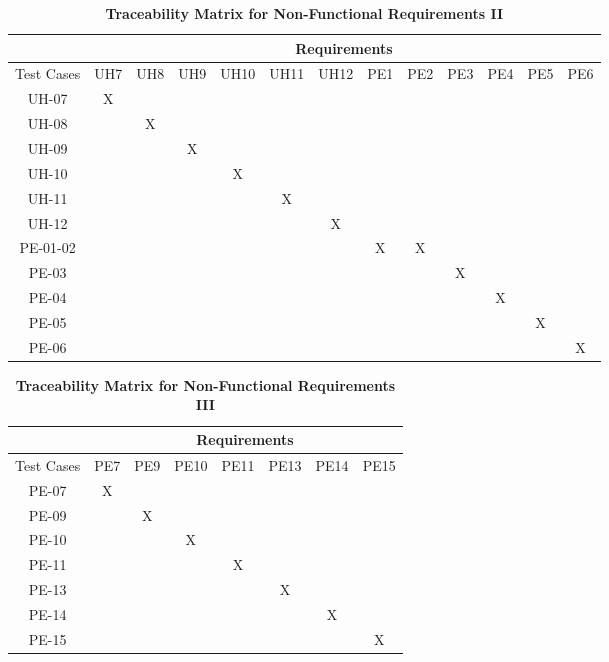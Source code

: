\documentclass[12pt, titlepage]{article}
\begin{document}
\begin{landscape}
\newpage

\begin{table}[h!]
\centering
\caption{\textbf{Traceability Matrix for Non-Functional Requirements II}}
\label{tab:trace_matrix_03}
\begin{tabular}{|c|c|c|c|c|c|c|c|c|c|c|c|c|}
\hline
& \multicolumn{12}{c|}{Requirements} \\
\hline
Test Cases & UH7 & UH8 & UH9 & UH10 & UH11 & UH12 & PE1 & PE2 & PE3 & PE4 & PE5 & PE6 \\
\hline
UH-07 & X & & & & & & & & & & & \\
\hline
UH-08 & & X & & & & & & & & & & \\
\hline
UH-09 & & & X & & & & & & & & & \\
\hline
UH-10 & & & & X & & & & & & & & \\
\hline
UH-11 & & & & & X & & & & & & & \\
\hline
UH-12 & & & & & & X & & & & & & \\
\hline
PE-01-02 & & & & & & & X & X & & & & \\
\hline
PE-03 & & & & & & & & & X & & & \\
\hline
PE-04 & & & & & & & & & & X & & \\
\hline
PE-05 & & & & & & & & & & & X & \\
\hline
PE-06 & & & & & & & & & & & & X \\
\hline
\end{tabular}
\end{table}

\newpage

\begin{table}[h!]
\centering
\caption{\textbf{Traceability Matrix for Non-Functional Requirements III}}
\label{tab:trace_matrix_03}
\begin{tabular}{|c|c|c|c|c|c|c|c|}
\hline
& \multicolumn{7}{c|}{Requirements} \\
\hline
Test Cases & PE7 & PE9 & PE10 & PE11 & PE13 & PE14 & PE15 \\
\hline
PE-07 & X & & & & & & \\
\hline
PE-09 & & X & & & & & \\
\hline
PE-10 & & & X & & & & \\
\hline
PE-11 & & & & X & & & \\
\hline
PE-13 & & & & & X & & \\
\hline
PE-14 & & & & & & X & \\
\hline
PE-15 & & & & & & & X \\
\hline
\end{tabular}
\end{table}

\end{landscape}
\end{document}
